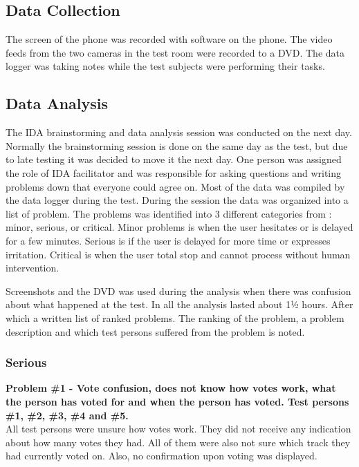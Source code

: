 \subsection{Data Collection}
The screen of the phone was recorded with software on the phone. The
video feeds from the two cameras in the test room were recorded to a
DVD. The data logger was taking notes while the test subjects were
performing their tasks.

\subsection{Data Analysis}
The IDA brainstorming and data analysis session was conducted on the next day. Normally the brainstorming session is done on the same day as the test, but due to late testing it was decided to move it the next day. One person was assigned the role of IDA facilitator and was responsible for asking questions and writing problems down that everyone could agree on. Most of the data was compiled by the data logger during the test. During the session the data was organized into a list of problem. The problems was identified into 3 different categories from \cite{molich2007usable}: minor, serious, or critical. Minor problems is when the user hesitates or is delayed for a few minutes. Serious is if the user is delayed for more time or expresses irritation. Critical is when the user total stop and cannot process without human intervention.

Screenshots and the DVD was used during the analysis when there was confusion about what happened at the test. In all the analysis lasted about 1½ hours. After which a written list of ranked problems. The ranking of the problem, a problem description and which test persons suffered from the problem is noted.

\subsubsection{Serious}
\textbf{Problem \#1 - Vote confusion, does not know how votes work, what the person has
    voted for and when the person has voted. Test persons \#1, \#2,
    \#3, \#4 and \#5.}\\
  All test persons were unsure how votes work. They did not receive
  any indication about how many votes they had. All of them were also
  not sure which track they had currently voted on. Also, no
  confirmation upon voting was displayed.\\


